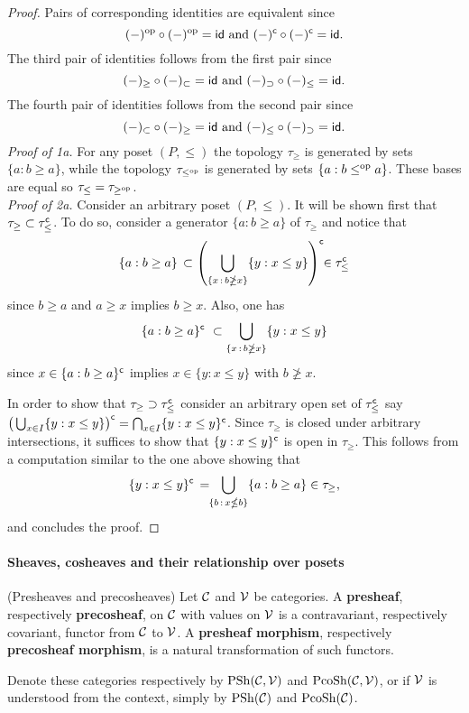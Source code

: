 \documentclass[thesis.tex]{subfiles}
\begin{document}
\begin{lemma}
\begin{proof}
Pairs of corresponding identities are equivalent since $$(-)^{\mathrm{op}}\circ(-)^{\mathrm{op}}=\mathsf{id}\text{ and }(-)^{\mathsf{c}}\circ(-)^{\mathsf{c}}=\mathsf{id}.$$
The third pair of identities follows from the first pair since $$(-)_\geq\circ(-)_\subset=\mathsf{id}\text{ and }(-)_\supset\circ(-)_\leq=\mathsf{id}.$$
The fourth pair of identities follows from the second pair since $$(-)_\subset\circ(-)_\geq=\mathsf{id}\text{ and }(-)_\leq\circ(-)_\supset=\mathsf{id}.$$
\textit{Proof of 1a.}\! For any poset $(P,\leq)$ the topology $\tau_\geq$ is generated by sets $\{a:b\geq a\}$, while the topology $\tau_{\leq^{\mathrm{op}}}$ is generated by sets $\{a:b\leq^{\mathrm{op}} a\}$. These bases are equal so $\tau_\leq=\tau_{\geq^{\mathrm{op}}}$.\vspace*{3pt}\\
\textit{Proof of 2a.} \!Consider an arbitrary poset $(P,\leq)$. It will be shown first that $\tau_\geq\subset\tau_\leq^{\mathsf{c}}$. To do so, consider a generator $\{a:b\geq a\}$ of $\tau_\geq$ and notice that
\begin{equation*}
\{a:b\geq a\}\,\subset\left(\bigcup_{\{x\,:\,b\ngeq x\}}\{y:x\leq y\}\right)^{\mathsf{c}}\!\!\in\tau_\leq^{\mathsf{c}}
\end{equation*}
since $b\geq a$ and $a\geq x$ implies $b\geq x$. Also, one has
$$\{a:b\geq a\}^\c\ \subset\bigcup_{\{x\,:\,b\ngeq x\}}\{y:x\leq y\}\vspace*{-8pt}$$
since $x\in\{a:b\geq a\}^{\mathsf{c}}$ implies $x\in\{y:x\leq y\}$ with $b\ngeq x$.

In order to show that $\tau_\geq\supset\tau_{\leq}^{\mathsf{c}}$ consider an arbitrary open set of $\tau_{\leq}^{\mathsf{c}}$ say $\big(\bigcup_{x\in I}\{y:x\leq y\}\big)^{\mathsf{c}}=\bigcap_{x\in I}\{y:x\leq y\}^{\mathsf{c}}$. Since $\tau_\geq$ is closed under arbitrary intersections, it suffices to show that $\{y:x\leq y\}^{\mathsf{c}}$ is open in $\tau_\geq$. This follows from a computation similar to the one above showing that
\begin{equation*}
\{y:x\leq y\}^\c\,=\!\!\bigcup_{\{b\,:\,x\nleq b\}}\{a:b\geq a\}\in\tau_\geq, \vspace*{-8pt}
\end{equation*}
and concludes the proof.
\end{proof}
\end{lemma}

\paragraph{Sheaves, cosheaves and their relationship over posets}

\begin{definition}(Presheaves and precosheaves)
Let $\operatorname{\mathcal{C}}$ and $\operatorname{\mathcal{V}}$ be categories. A \textbf{presheaf}, respectively \textbf{precosheaf}, on $\operatorname{\mathcal{C}}$ with values on $\operatorname{\mathcal{V}}$ is a
contravariant, respectively covariant, functor from $\operatorname{\mathcal{C}}$ to $\operatorname{\mathcal{V}}$. A \textbf{presheaf morphism}, respectively \textbf{precosheaf morphism}, is a natural transformation of such functors.

Denote these categories respectively by $\operatorname{PSh}(\operatorname{\mathcal{C}},\operatorname{\mathcal{V}})$ and $\operatorname{PcoSh}(\operatorname{\mathcal{C}},\operatorname{\mathcal{V}})$, or if $\operatorname{\mathcal{V}}$ is understood from the context, simply by $\operatorname{PSh}(\operatorname{\mathcal{C}})$ and $\operatorname{PcoSh}(\operatorname{\mathcal{C}})$.
\end{definition}
\end{document}
